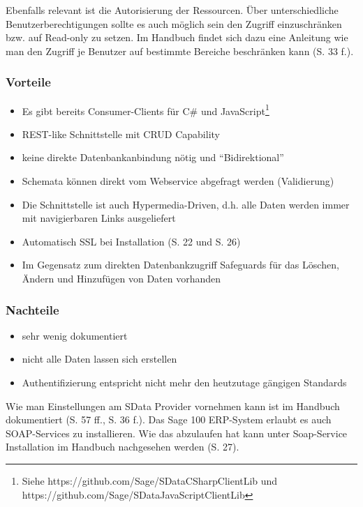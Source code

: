 Ebenfalls relevant ist die Autorisierung der Ressourcen. Über unterschiedliche Benutzerberechtigungen sollte es auch möglich sein den Zugriff einzuschränken bzw. auf Read-only zu setzen. Im Handbuch findet sich dazu eine Anleitung wie man den Zugriff je Benutzer auf bestimmte Bereiche beschränken kann \cite{sageadministrationshandbuch} (S. 33 f.).

\subsubsection*{Vorteile}
\begin{itemize}
    \item Es gibt bereits Consumer-Clients für C\# und JavaScript\footnote{Siehe https://github.com/Sage/SDataCSharpClientLib und https://github.com/Sage/SDataJavaScriptClientLib}
    \item REST-like Schnittstelle mit CRUD Capability
    \item keine direkte Datenbankanbindung nötig und “Bidirektional”
    \item Schemata können direkt vom Webservice abgefragt werden (Validierung)
    \item Die Schnittstelle ist auch Hypermedia-Driven, d.h. alle Daten werden immer mit navigierbaren Links ausgeliefert
    \item Automatisch SSL bei Installation \cite{sageadministrationshandbuch} (S. 22 und S. 26)
    \item Im Gegensatz zum direkten Datenbankzugriff Safeguards für das Löschen, Ändern und Hinzufügen von Daten vorhanden
\end{itemize}

\subsubsection*{Nachteile}
\begin{itemize}
    \item sehr wenig dokumentiert
    \item nicht alle Daten lassen sich erstellen
    \item Authentifizierung entspricht nicht mehr den heutzutage gängigen Standards \cite{owasp_authentication}
\end{itemize}

Wie man Einstellungen am SData Provider vornehmen kann ist im Handbuch dokumentiert \cite{sageadministrationshandbuch} (S. 57 ff., S. 36 f.).
Das Sage 100 ERP-System erlaubt es auch SOAP-Services zu installieren. Wie das abzulaufen hat kann unter Soap-Service Installation im Handbuch nachgesehen werden \cite{sageadministrationshandbuch} (S. 27).

